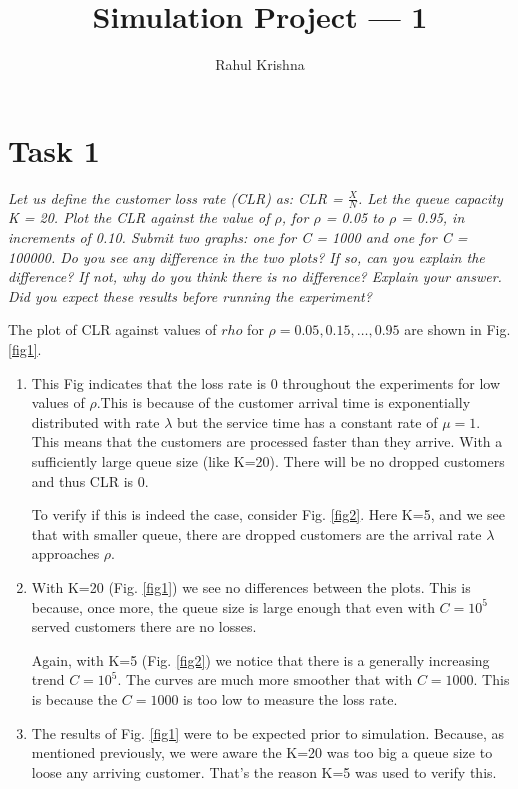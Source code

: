 \documentclass[10pt]{article}
\title{\textbf{Simulation Project --- 1}}
\author{Rahul Krishna}
\affil{North Carolina State University\\Email: \href{mailto:rkrish11@ncsu.edu}{rkrish11@ncsu.edu}\thanks{Source code: \url{https://github.com/rahlk/CSC579__Computer_Performance_Modeling}}}
\date{}
\begin{document}
\maketitle
\section*{Task 1}
\textit{Let us define the customer loss rate
 (CLR) as: CLR = $\frac{X}{N}$. Let the queue capacity K = 20. Plot the CLR against the value of
 $\rho$, for $\rho$ = 0.05 to $\rho$ = 0.95, in increments of 0.10. Submit two graphs: one for C = 1000 and one for C = 100000. Do you see any difference in the two plots? If so, can you explain the difference? If not, why do you think there is no difference? Explain your answer. Did you expect these results before running the experiment?\\}
 
 
 
 The plot of CLR against values of $rho$ for $\rho=0.05, 0.15,\ldots,0.95$ are shown in Fig. \ref{fig1}. 
 
 \begin{enumerate}
 
 \item This Fig indicates that the loss rate is 0 throughout the experiments for low values of $\rho$.This is because of the customer arrival time is exponentially distributed with rate $\lambda$ but the service time has a constant rate of $\mu=1$. This means that the customers are processed faster than they arrive. With a sufficiently large queue size (like K=20). There will be no dropped customers and thus CLR is 0.
 
 To verify if this is indeed the case, consider Fig. \ref{fig2}. Here K=5, and we see that with smaller queue, there are dropped customers are the arrival rate $\lambda$ approaches $\rho$.
 
 \item With K=20 (Fig. \ref{fig1}) we see no differences between the plots. This is because, once more, the queue size is large enough that even with $C=10^5$ served customers there are no losses. 
 
 Again, with K=5 (Fig. \ref{fig2}) we notice that there is a generally increasing trend $C=10^5$. The curves are much more smoother that with $C=1000$. This is because the $C=1000$ is too low to measure the loss rate.
 
 \item The results of Fig. \ref{fig1} were to be expected prior to simulation. Because, as mentioned previously, we were aware the K=20 was too big a queue size to loose any arriving customer. That's the reason K=5 was used to verify this.
 
 \end{enumerate}
\end{document}
